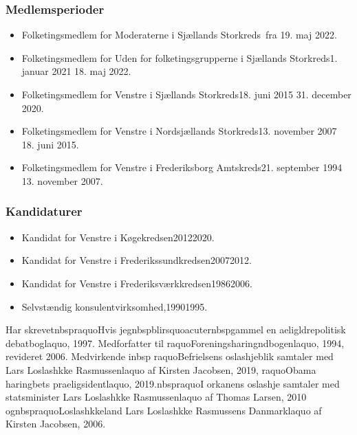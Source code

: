 \documentclass[11pt, a4paper]{awesome-cv}
\begin{document}
\begin{cvletter}
\subsubsection*{Medlemsperioder}
\begin{itemize}
\item Folketingsmedlem for Moderaterne i Sjællands Storkreds fra 19. maj 2022.
\item Folketingsmedlem for Uden for folketingsgrupperne i Sjællands Storkreds1. januar 2021  18. maj 2022.
\item Folketingsmedlem for Venstre i Sjællands Storkreds18. juni 2015  31. december 2020.
\item Folketingsmedlem for Venstre i Nordsjællands Storkreds13. november 2007  18. juni 2015.
\item Folketingsmedlem for Venstre i Frederiksborg Amtskreds21. september 1994  13. november 2007.
\end{itemize}
\subsubsection*{Kandidaturer}
\begin{itemize}
\item Kandidat for Venstre i Køgekredsen20122020.
\item Kandidat for Venstre i Frederikssundkredsen20072012.
\item Kandidat for Venstre i Frederiksværkkredsen19862006.
\end{itemize}
\begin{itemize}
\item Selvstændig konsulentvirksomhed,19901995.
\end{itemize}
Har skrevetnbspraquoHvis jegnbspblirsquoacuternbspgammel  en aeligldrepolitisk debatboglaquo, 1997. Medforfatter til raquoForeningsharingndbogenlaquo, 1994, revideret 2006. Medvirkende inbsp raquoBefrielsens oslashjeblik  samtaler med Lars Loslashkke Rasmussenlaquo af Kirsten Jacobsen, 2019, raquoObama  haringbets praeligsidentlaquo, 2019.nbspraquoI orkanens oslashje  samtaler med statsminister Lars Loslashkke Rasmussenlaquo af Thomas Larsen, 2010 ognbspraquoLoslashkkeland  Lars Loslashkke Rasmussens Danmarklaquo af Kirsten Jacobsen, 2006.

\end{cvletter}
\end{document}
